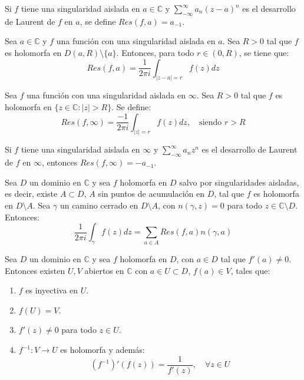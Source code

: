 \begin{definition}
    Si $f$ tiene una singularidad aislada en $a \in \mathbb{C}$ y $\sum_{-\infty}^\infty a_n(z-a)^n$ es el desarrollo de Laurent de $f$ en $a$, se define $Res(f, a) = a_{-1}$.
\end{definition}

\begin{proposition}
    Sea $a \in \mathbb{C}$ y $f$ una función con una singularidad aislada en $a$.
    Sea $R > 0$ tal que $f$ es holomorfa en $D(a, R) \setminus \{a\}$.
    Entonces, para todo $r \in (0, R)$, se tiene que:
    $$Res(f, a) = \frac{1}{2\pi i} \int_{|z-a| = r} f(z)dz$$
\end{proposition}

\begin{proposition}
    Sea $f$ una función con una singularidad aislada en $\infty$.
    Sea $R > 0$ tal que $f$ es holomorfa en $\{z \in \mathbb{C} : |z| > R\}$.
    Se define:
    $$Res(f, \infty) = \frac{-1}{2\pi i} \int_{|z| = r} f(z)dz, \quad \text{siendo } r > R$$
\end{proposition}

\begin{proposition}
    Si $f$ tiene una singularidad aislada en $\infty$ y $\sum_{-\infty}^\infty a_nz^n$ es el desarrollo de Laurent de $f$ en $\infty$, entonces $Res(f, \infty) = -a_{-1}$.
\end{proposition}

\begin{theorem}
    Sea $D$ un dominio en $\mathbb{C}$ y sea $f$ holomorfa en $D$ salvo por singularidades aisladas, es decir, existe $A \subset D$, $A$ sin puntos de acumulación en $D$, tal que $f$ es holomorfa en $D \setminus A$.
    Sea $\gamma$ un camino cerrado en $D \setminus A$, con $n(\gamma, z) = 0$ para todo $z \in \mathbb{C} \setminus D$.
    Entonces:
    $$\frac{1}{2\pi i} \int_\gamma f(z)dz = \sum_{a \in A} Res(f, a)n(\gamma, a)$$
\end{theorem}

\begin{theorem}
    Sea $D$ un dominio en $\mathbb{C}$ y sea $f$ holomorfa en $D$, con $a \in D$ tal que $f'(a) \neq 0$.
    Entonces existen $U, V$ abiertos en $\mathbb{C}$ con $a \in U \subset D$, $f(a) \in V$, tales que:
    \begin{enumerate}
        \item $f$ es inyectiva en $U$.
        \item $f(U) = V$.
        \item $f'(z) \neq 0$ para todo $z \in U$.
        \item $f^{-1}: V \to U$ es holomorfa y además:
              $$(f^{-1})'(f(z)) = \frac{1}{f'(z)}, \quad \forall z \in U$$
    \end{enumerate}
\end{theorem}

